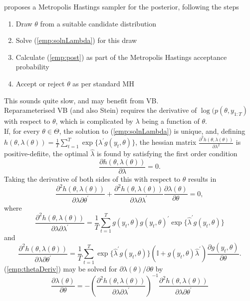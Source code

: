 \documentclass[
12pt, %
onehalfspacing, %
nohyperref, %
headsepline, %
chapterinoneline, %
]{MastersDoctoralThesis} %
\begin{document}
\citet{Chib2017} proposes a Metropolis Hastings sampler for the posterior, following the steps
\begin{enumerate}
\item Draw $\theta$ from a suitable candidate distribution
\item Solve (\ref{emp:solnLambda}) for this draw
\item Calculate (\ref{emp:post}) as part of the Metropolis Hastings acceptance probability
\item Accept or reject $\theta$ as per standard MH
\end{enumerate}
This sounds quite slow, and may benefit from VB.
\\

Reparameterised VB (and also Stein) requires the derivative of $\log(p(\theta, y_{1:T})$ with respect to $\theta$, which is complicated by $\lambda$ being a function of $\theta$.
\\

If, for every $\theta \in \Theta$, the solution to  (\ref{emp:solnLambda}) is unique, and, defining $h(\theta, \lambda(\theta)) =  \frac{1}{T} \sum_{t=1}^T \exp \{\lambda^{\prime} g(y_t, \theta) \}$, the hessian matrix $\frac{\partial^2  h(\theta, \lambda(\theta))}{\partial \lambda^2}$ is positive-defiite, the optimal $\hat{\lambda}$ is found by satisfying the first order condition
\begin{equation}
\label{emp:lambdaDeriv}
\frac{\partial h(\theta, \lambda(\theta))}{\partial \lambda} = 0.
\end{equation}
Taking the derivative of both sides of this with respect to $\theta$ results in
\begin{equation}
\label{emp:thetaDeriv}
\frac{\partial^2  h(\theta, \lambda(\theta))}{\partial \lambda \partial \theta^{\prime}} + \frac{\partial^2  h(\theta, \lambda(\theta))}{\partial \lambda \partial \lambda^{\prime}} \frac{\partial \lambda(\theta)}{\partial \theta} = 0,
\end{equation}
where
\begin{equation}
\label{emp:hessian}
\frac{\partial^2  h(\theta, \lambda(\theta))}{\partial \lambda \partial \lambda^{\prime}} = \frac{1}{T} \sum_{t=1}^T g(y_t, \theta) g(y_t, \theta)^{\prime} \exp\{\hat{\lambda}^{\prime} g(y_t, \theta) \}
\end{equation}
and
\begin{equation}
\label{emp:crossDeriv}
\frac{\partial^ 2  h(\theta, \lambda(\theta))}{\partial \lambda \partial \theta^{\prime}} = \frac{1}{T} \sum_{t=1}^T \exp\{\hat{\lambda}^{\prime} g(y_t, \theta) \} \left( \mathbb{I} + g(y_t, \theta) \hat{\lambda}^{\prime} \right) \frac{\partial g(y_t, \theta)}{\partial \theta}.
\end{equation}
(\ref{emp:thetaDeriv}) may be solved for $\partial \lambda(\theta) / \partial \theta$ by
\begin{equation}
\label{emp:thetaDerivSoln}
 \frac{\partial \lambda(\theta)}{\partial \theta} = -\left(\frac{\partial^2  h(\theta, \lambda(\theta))}{\partial \lambda \partial \lambda^{\prime}}\right)^{-1}\frac{\partial^2  h(\theta, \lambda(\theta))}{\partial \lambda \partial \theta^{\prime}}
\end{equation}
\end{document}
